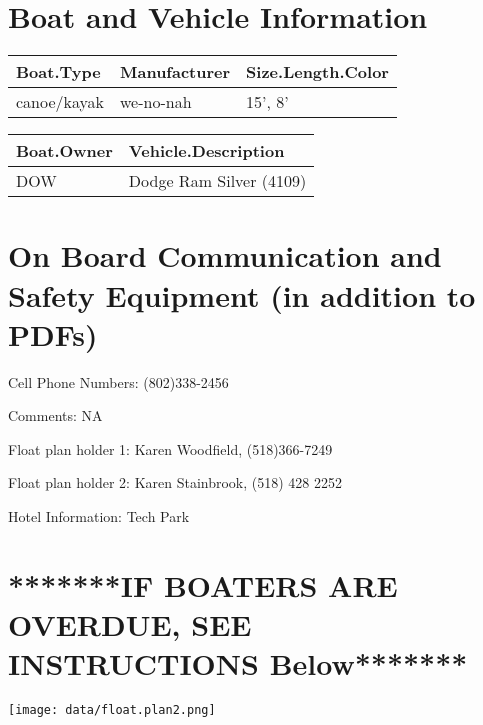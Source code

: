 \documentclass[
]{article}
\begin{document}
\hypertarget{boat-and-vehicle-information}{%
\section{Boat and Vehicle
Information}\label{boat-and-vehicle-information}}

\begin{tabular}{l|l|l}
\hline
Boat.Type & Manufacturer & Size.Length.Color\\
\hline
canoe/kayak & we-no-nah & 15', 8'\\
\hline
\end{tabular}

\begin{tabular}{l|l}
\hline
Boat.Owner & Vehicle.Description\\
\hline
DOW & Dodge Ram Silver (4109)\\
\hline
\end{tabular}

\hypertarget{on-board-communication-and-safety-equipment-in-addition-to-pdfs}{%
\section{On Board Communication and Safety Equipment (in addition to
PDFs)}\label{on-board-communication-and-safety-equipment-in-addition-to-pdfs}}

Cell Phone Numbers: (802)338-2456

Comments: NA

Float plan holder 1: Karen Woodfield, (518)366-7249

Float plan holder 2: Karen Stainbrook, (518) 428 2252

Hotel Information: Tech Park

\hypertarget{if-boaters-are-overdue-see-instructions-below}{%
\section{*******IF BOATERS ARE OVERDUE, SEE INSTRUCTIONS
Below*******}\label{if-boaters-are-overdue-see-instructions-below}}

\texttt{[image: data/float.plan2.png]}
\end{document}
